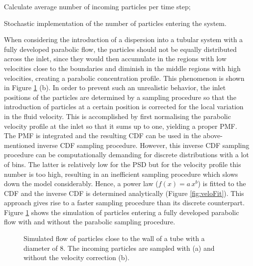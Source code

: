 \begin{algorithm}[]
 \SetAlgoLined
 Calculate average number of incoming particles per time step; \\
  \caption{Stochastic implementation of the number of particles entering the system.\label{alg:stoch}}
\end{algorithm}
When considering the introduction of a dispersion into a tubular system with a fully developed parabolic flow, the particles should not be equally distributed across the inlet, since they would then accumulate in the regions with low velocities close to the boundaries and diminish in the middle regions with high velocities, creating a parabolic concentration profile. This phenomenon is shown in Figure \ref{fig:parSampComp} (b). In order to prevent such an unrealistic behavior, the inlet positions of the particles are determined by a sampling procedure so that the introduction of particles at a certain position is corrected for the local variation in the fluid velocity. This is accomplished by first normalising the parabolic velocity profile at the inlet so that it sums up to one, yielding a proper \gls{PMF}. The \gls{PMF} is integrated and the resulting \gls{CDF} can be used in the above-mentioned inverse CDF sampling procedure. However, this inverse CDF sampling procedure can be computationally demanding for discrete distributions with a lot of bins. The latter is relatively low for the PSD but for the velocity profile this number is too high, resulting in an inefficient sampling procedure which slows down the model considerably. Hence, a power law ($f(x)= a\, x^{b}$) is fitted to the \gls{CDF} and the inverse CDF is determined analytically (Figure \ref{fig:veloFit}).
This approach gives rise to a faster sampling procedure than its discrete counterpart. Figure \ref{fig:parSampComp} shows the simulation of particles entering a fully developed parabolic flow with and without the parabolic sampling procedure. 
 
 \begin{figure}[H]
\centering
\centerline{
}
\caption{Simulated flow of particles close to the wall of a tube with a diameter of  \unit{8}{\milli\metre}. The incoming particles are sampled with (a) and without the velocity correction (b). \label{fig:parSampComp}}
\end{figure}


